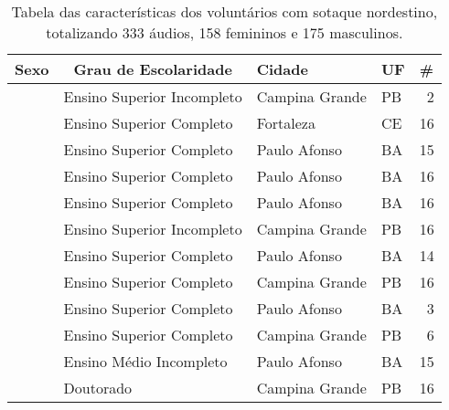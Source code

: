 \begin{table}[h]
\caption{Tabela das características dos voluntários com sotaque nordestino, totalizando 333 áudios, 158 femininos e 175 masculinos.} \label{Tabela_sulist}
\begin{tabular}{|l|l|l|l|r|}
\hline
\multicolumn{1}{|c|}{Sexo}   & \multicolumn{1}{c|}{Grau de Escolaridade}     & Cidade            & UF & \multicolumn{1}{l|}{\#} \\ \hline
                             & Ensino Superior Incompleto                    & Campina Grande    & PB & 2                       \\ \cline{2-5} 
                             & Ensino Superior Completo                      & Fortaleza         & CE & 16                      \\ \cline{2-5} 
                             & Ensino Superior Completo                      & Paulo Afonso      & BA & 15                      \\ \cline{2-5} 
                             & Ensino Superior Completo                      & Paulo Afonso      & BA & 16                      \\ \cline{2-5} 
                             & Ensino Superior Completo                      & Paulo Afonso      & BA & 16                      \\ \cline{2-5} 
                             & Ensino Superior Incompleto                    & Campina Grande    & PB & 16                      \\ \cline{2-5} 
                             & Ensino Superior Completo                      & Paulo Afonso      & BA & 14                      \\ \cline{2-5} 
                             & Ensino Superior Completo                      & Campina Grande    & PB & 16                      \\ \cline{2-5} 
                             & Ensino Superior Completo                      & Paulo Afonso      & BA & 3                       \\ \cline{2-5} 
                             & Ensino Superior Completo                      & Campina Grande    & PB & 6                       \\ \cline{2-5} 
                             & Ensino Médio Incompleto                       & Paulo Afonso      & BA & 15                      \\ \cline{2-5} 
                             & Doutorado                                     & Campina Grande    & PB & 16                      \\ \cline{2-5} 

\end{tabular}
\end{table}
